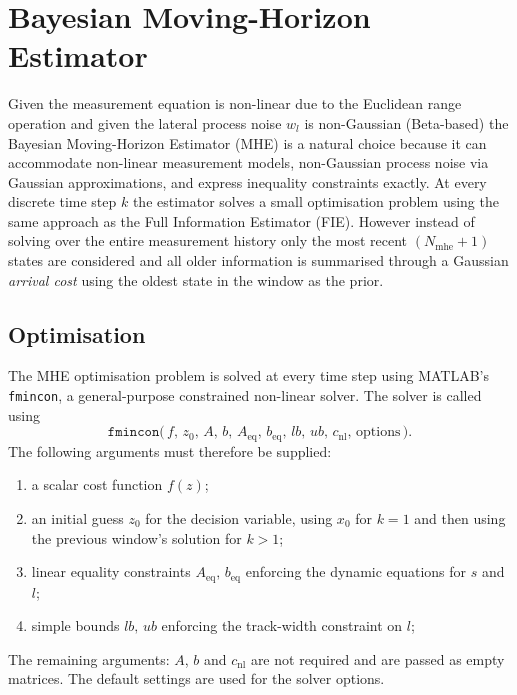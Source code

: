 \section{Bayesian Moving-Horizon Estimator}
\label{sec:mhe}

 Given the measurement equation is non-linear due to the Euclidean range operation and given the lateral process noise $w_{l}$ is non-Gaussian (Beta-based) the Bayesian Moving-Horizon Estimator (MHE) is a natural choice because it can accommodate non-linear measurement models, non-Gaussian process noise via Gaussian approximations, and express inequality constraints exactly. At every discrete time step $k$ the estimator solves a small optimisation problem using the same approach as the Full Information Estimator (FIE). However instead of solving over the entire measurement history only the most recent $(N_{\text{mhe}}+1)$ states are considered and all older information is summarised through a Gaussian \emph{arrival cost} using the oldest state in the window as the prior. 

\subsection{Optimisation}
\label{subsec:est_fmincon}

The MHE optimisation problem is solved at every time step using MATLAB's \texttt{fmincon}, a general-purpose constrained non-linear solver. The solver is called using
\begin{equation*}
    \texttt{fmincon}\bigl(\,f,\, z_{0},\, A,\, b,\, A_{\text{eq}},\, b_{\text{eq}},\, lb,\, ub,\, c_{\text{nl}},\, \text{options}\,\bigr).
\end{equation*}
The following arguments must therefore be supplied:
\begin{enumerate}
    \item a scalar cost function $f(z)$;
    \item an initial guess $z_{0}$ for the decision variable, using $x_0$ for $k=1$ and then using the previous window's solution for $k>1$;
    \item linear equality constraints $A_{\text{eq}},\, b_{\text{eq}}$ enforcing the dynamic equations for $s$ and $l$;
    \item simple bounds $lb,\, ub$ enforcing the track-width constraint on $l$;
\end{enumerate}
The remaining arguments: $A$, $b$ and $c_{\text{nl}}$ are not required and are passed as empty matrices. The default settings are used for the solver options. 

